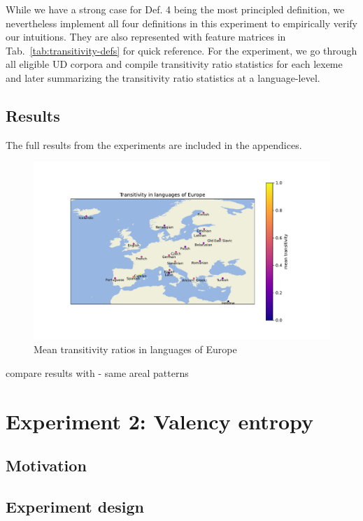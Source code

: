 While we have a strong case for Def. 4 being the most principled definition, we nevertheless implement all four definitions in this experiment to empirically verify our intuitions. They are also represented with feature matrices in Tab.~\ref{tab:transitivity-defs} for quick reference. For the experiment, we go through all eligible UD corpora and compile transitivity ratio statistics for each lexeme and later summarizing the transitivity ratio statistics at a language-level.

\subsection{Results}

The full results from the experiments are included in the appendices. 

\begin{figure}
  \centering
  \includegraphics[width=\textwidth]{figures/transitivity_europe.pdf}
  \caption{Mean transitivity ratios in languages of Europe}
  \label{fig:transitivity_europe}
\end{figure}

compare results with \citet{say2014} - same areal patterns

\section{Experiment 2: Valency entropy}
\subsection{Motivation}
\subsection{Experiment design}
